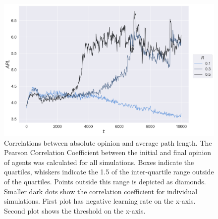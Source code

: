 \documentclass{article}
\begin{document}
\begin{figure}[H]
    \centering
    \includegraphics[width=.8\linewidth]{../plots/example/Example_Average_Path_Length.png}
  \caption{Correlations between absolute opinion and average path length. The Pearson Correlation Coefficient between the initial and final opinion of agents was calculated for all simulations. Boxes indicate the quartiles, whiskers indicate the 1.5 of the inter-quartile range outside of the quartiles. Points outside this range is depicted as diamonds. Smaller dark dots show the correlation coefficient for individual simulations. First plot has negative learning rate on the x-axis. Second plot shows the threshold on the x-axis. }
  \label{fig:sfig1}
\end{figure}
\end{document}
